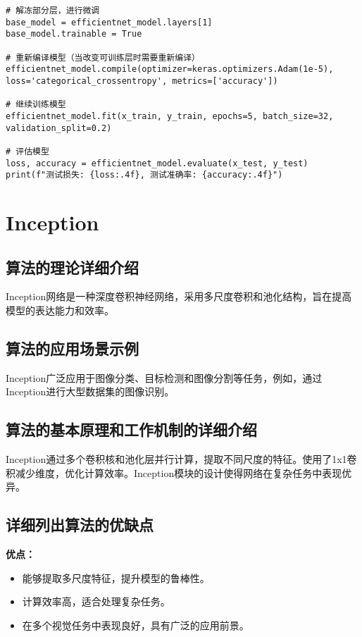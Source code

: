 \begin{lstlisting}
# 解冻部分层，进行微调
base_model = efficientnet_model.layers[1]
base_model.trainable = True

# 重新编译模型（当改变可训练层时需要重新编译）
efficientnet_model.compile(optimizer=keras.optimizers.Adam(1e-5), loss='categorical_crossentropy', metrics=['accuracy'])

# 继续训练模型
efficientnet_model.fit(x_train, y_train, epochs=5, batch_size=32, validation_split=0.2)

# 评估模型
loss, accuracy = efficientnet_model.evaluate(x_test, y_test)
print(f"测试损失: {loss:.4f}, 测试准确率: {accuracy:.4f}")

\end{lstlisting}


\section{Inception}
\subsection*{算法的理论详细介绍}
Inception网络是一种深度卷积神经网络，采用多尺度卷积和池化结构，旨在提高模型的表达能力和效率。

\subsection*{算法的应用场景示例}
Inception广泛应用于图像分类、目标检测和图像分割等任务，例如，通过Inception进行大型数据集的图像识别。

\subsection*{算法的基本原理和工作机制的详细介绍}
Inception通过多个卷积核和池化层并行计算，提取不同尺度的特征。使用了1x1卷积减少维度，优化计算效率。Inception模块的设计使得网络在复杂任务中表现优异。

\subsection*{详细列出算法的优缺点}
\textbf{优点：}
\begin{itemize}
    \item 能够提取多尺度特征，提升模型的鲁棒性。
    \item 计算效率高，适合处理复杂任务。
    \item 在多个视觉任务中表现良好，具有广泛的应用前景。
\end{itemize}

